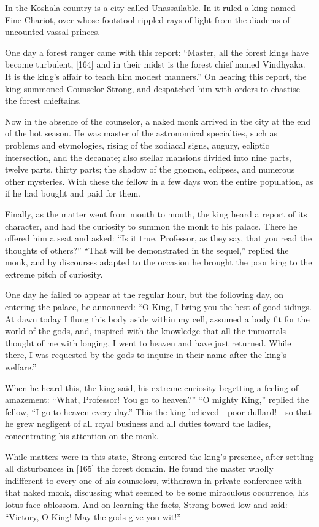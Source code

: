 \documentclass[article, twoside, 14pt]{memoir}
\begin{document}
\label{s25}

In the Koshala country is a city called Unassailable. In it ruled a
king named Fine-Chariot, over whose footstool rippled rays of light
from the diadems of uncounted vassal princes.

One day a forest ranger came with this report:
``Master, all the forest kings have become turbulent, [164] and in their midst is the forest chief named Vindhyaka. It is the king's affair to teach him modest manners.''
On hearing this report, the king summoned Counselor Strong, and
despatched him with orders to chastise the forest chieftains.

Now in the absence of the counselor, a naked monk arrived in the
city at the end of the hot season. He was master of the
astronomical specialties, such as problems and etymologies, rising
of the zodiacal signs, augury, ecliptic intersection, and the
decanate; also stellar mansions divided into nine parts, twelve
parts, thirty parts; the shadow of the gnomon, eclipses, and
numerous other mysteries. With these the fellow in a few days won
the entire population, as if he had bought and paid for them.

Finally, as the matter went from mouth to mouth, the king heard a
report of its character, and had the curiosity to summon the monk
to his palace. There he offered him a seat and asked:
``Is it true, Professor, as they say, that you read the thoughts of others?''
``That will be demonstrated in the sequel,'' replied the monk, and
by discourses adapted to the occasion he brought the poor king to
the extreme pitch of curiosity.

One day he failed to appear at the regular hour, but the following
day, on entering the palace, he announced:
``O King, I bring you the best of good tidings. At dawn today I flung this body aside within my cell, assumed a body fit for the world of the gods, and, inspired with the knowledge that all the immortals thought of me with longing, I went to heaven and have just returned. While there, I was requested by the gods to inquire in their name after the king's welfare.''

When he heard this, the king said, his extreme curiosity begetting
a feeling of amazement: ``What, Professor! You go to heaven?''
``O mighty King,'' replied the fellow,
``I go to heaven every day.'' This the king believed---poor
dullard!---so that he grew negligent of all royal business and all
duties toward the ladies, concentrating his attention on the monk.

While matters were in this state, Strong entered the king's
presence, after settling all disturbances in [165] the forest
domain. He found the master wholly indifferent to every one of his
counselors, withdrawn in private conference with that naked monk,
discussing what seemed to be some miraculous occurrence, his
lotus-face ablossom. And on learning the facts, Strong bowed low
and said: ``Victory, O King! May the gods give you wit!''
\end{document}
